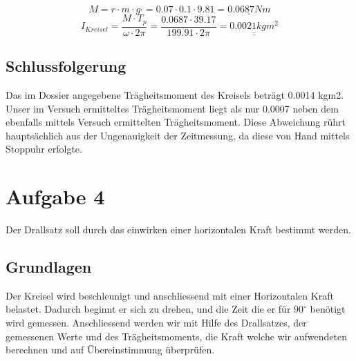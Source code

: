 \documentclass{article}
\begin{document}
\begin{equation}
M=r \cdot m \cdot g \cdot = 0.07 \cdot 0.1 \cdot 9.81 = \underline{0.0687Nm}
\end{equation}
\begin{equation}
 I_{Kreisel}= \frac{M \cdot T_p}{\omega \cdot 2\pi}= \frac{0.0687 \cdot 39.17}{199.91 \cdot 2\pi}= \underline{\underline{0.0021kgm^2}}
\end{equation}

\subsection{Schlussfolgerung}
Das im Dossier angegebene Trägheitsmoment des Kreisels beträgt 0.0014 kgm2. Unser im Versuch
ermitteltes Trägheitsmoment liegt als nur 0.0007 neben dem ebenfalls mittels Versuch ermittelten
Trägheitsmoment. Diese Abweichung rührt hauptsächlich aus der Ungenauigkeit der Zeitmessung, da
diese von Hand mittels Stoppuhr erfolgte.
\section{Aufgabe 4}
Der Drallsatz soll durch das einwirken einer horizontalen Kraft bestimmt werden.
\subsection{Grundlagen}
Der Kreisel wird beschleunigt und anschliessend mit einer Horizontalen Kraft belastet. Dadurch beginnt er sich zu drehen, und die Zeit die er für $90^\circ$ benötigt wird gemessen. Anschliessend werden wir mit Hilfe des Drallsatzes, der gemessenen Werte und des Trägheitsmoments, die Kraft welche wir aufwendeten berechnen und auf Übereinstimmung überprüfen.
\end{document}
